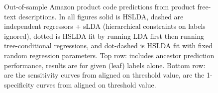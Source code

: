 \documentclass{article}
\begin{document}
\begin{figure}[htbp]
\begin{center}
\caption{Out-of-sample Amazon product code predictions from product free-text descriptions.  In all figures solid is HSLDA, dashed are independent regressors + sLDA (hierarchical constraints on labels ignored), dotted is HSLDA fit by running LDA first then running tree-conditional regressions, and dot-dashed is HSLDA fit with fixed random regression parameters.  Top row:   includes ancestor prediction performance,   results are for given (leaf) labels alone.  Bottom row:  are the sensitivity curves from  aligned on threshold value,   are the 1-specificity curves from  aligned on threshold value.}
\label{fig:icd9}
\end{center}
\end{figure}
\end{document}
